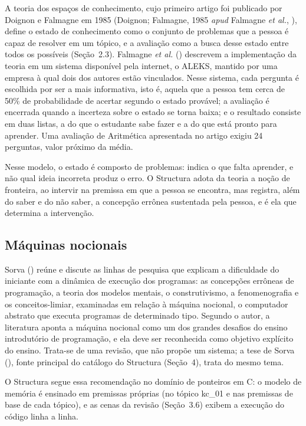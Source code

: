 A teoria dos espaços de conhecimento, cujo primeiro artigo foi publicado por Doignon e Falmagne em 1985 (Doignon; Falmagne, 1985 \textit{apud} Falmagne \textit{et al.}, \citeyear{falmagne2006}), define o estado de conhecimento como o conjunto de problemas que a pessoa é capaz de resolver em um tópico, e a avaliação como a busca desse estado entre todos os possíveis (Seção~2.3). Falmagne \textit{et al.} (\citeyear{falmagne2006}) descrevem a implementação da teoria em um sistema disponível pela internet, o ALEKS, mantido por uma empresa à qual dois dos autores estão vinculados. Nesse sistema, cada pergunta é escolhida por ser a mais informativa, isto é, aquela que a pessoa tem cerca de 50\% de probabilidade de acertar segundo o estado provável; a avaliação é encerrada quando a incerteza sobre o estado se torna baixa; e o resultado consiste em duas listas, a do que o estudante sabe fazer e a do que está pronto para aprender. Uma avaliação de Aritmética apresentada no artigo exigiu 24 perguntas, valor próximo da média.

Nesse modelo, o estado é composto de problemas: indica o que falta aprender, e não qual ideia incorreta produz o erro. O Structura adota da teoria a noção de fronteira, ao intervir na premissa em que a pessoa se encontra, mas registra, além do saber e do não saber, a concepção errônea sustentada pela pessoa, e é ela que determina a intervenção.

\subsection{Máquinas nocionais}

Sorva (\citeyear{sorva2013}) reúne e discute as linhas de pesquisa que explicam a dificuldade do iniciante com a dinâmica de execução dos programas: as concepções errôneas de programação, a teoria dos modelos mentais, o construtivismo, a fenomenografia e os conceitos-limiar, examinadas em relação à máquina nocional, o computador abstrato que executa programas de determinado tipo. Segundo o autor, a literatura aponta a máquina nocional como um dos grandes desafios do ensino introdutório de programação, e ela deve ser reconhecida como objetivo explícito do ensino. Trata-se de uma revisão, que não propõe um sistema; a tese de Sorva (\citeyear{sorva2012}), fonte principal do catálogo do Structura (Seção~4), trata do mesmo tema.

O Structura segue essa recomendação no domínio de ponteiros em C: o modelo de memória é ensinado em premissas próprias (no tópico kc\_01 e nas premissas de base de cada tópico), e as cenas da revisão (Seção~3.6) exibem a execução do código linha a linha.

